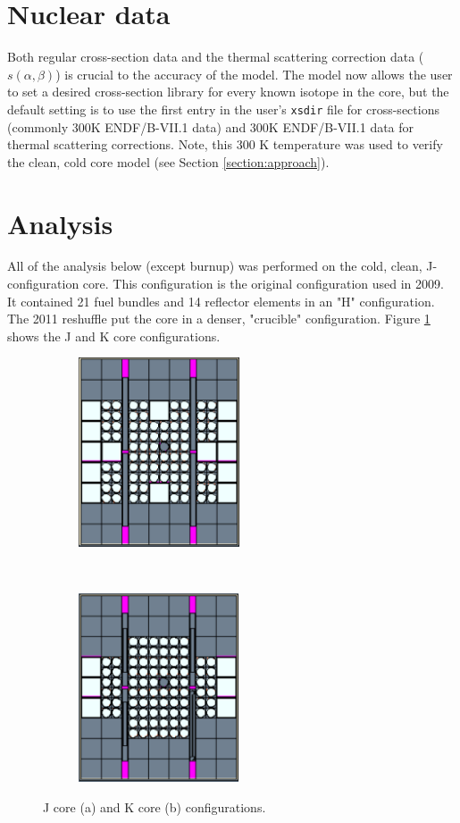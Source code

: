 \documentclass{UWNR_modeling}
\begin{document}
\section{Nuclear data}

Both regular cross-section data and the thermal scattering correction data ($s(\alpha,\beta)$) is crucial to the accuracy of the model. The model now allows the user to set a desired cross-section library for every known isotope in the core, but the default setting is to use the first entry in the user's \texttt{xsdir} file for cross-sections (commonly 300K ENDF/B-VII.1 data) and 300K ENDF/B-VII.1 data for thermal scattering corrections.  Note, this 300 K temperature was used to verify the clean, cold core model (see Section \ref{section:approach}). 

\section{Analysis}\label{section:analysis}
All of the analysis below (except burnup) was performed on the cold, clean, J-configuration core. This configuration is the original configuration used in 2009. It contained 21 fuel bundles and 14 reflector elements in an "H" configuration. The 2011 reshuffle put the core in a denser, "crucible" configuration. Figure \ref{fig:core_configurations} shows the J and K core configurations.

\begin{figure}[h]
    \centering
    \begin{subfigure}[t]{0.5\textwidth}
        \centering
        \includegraphics[height=2.2in]{jcore.pdf}
        \caption{}
    \end{subfigure}%
    ~ 
    \begin{subfigure}[t]{0.5\textwidth}
        \centering
        \includegraphics[height=2.2in]{kcore.pdf}
        \caption{}
    \end{subfigure}
    \caption{J core (a) and K core (b) configurations.}
    \label{fig:core_configurations}
\end{figure}
\end{document}
